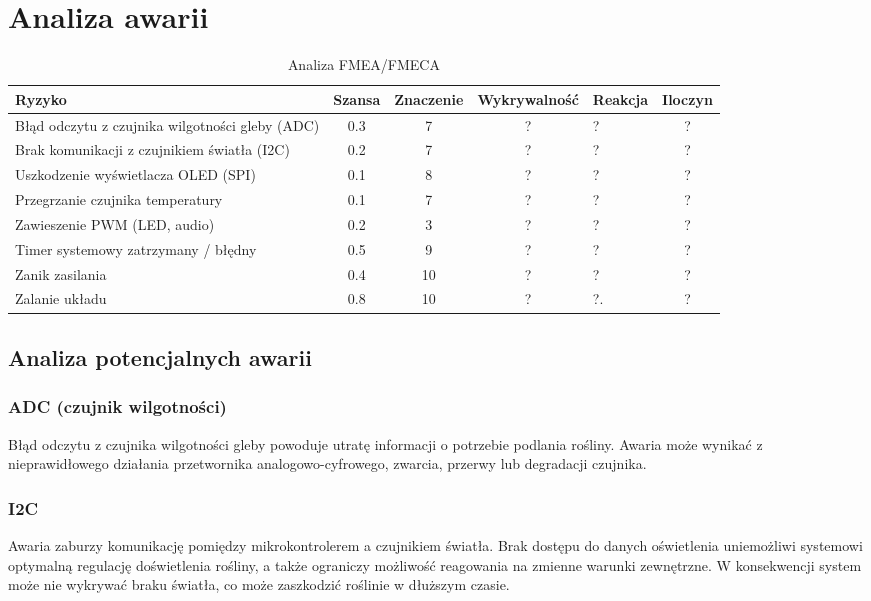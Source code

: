 \documentclass{article}
\begin{document}
\section{Analiza awarii}

\begin{table}[H]
\centering
\caption{Analiza FMEA/FMECA}
\begin{tabular}{|p{4.2cm}|c|c|c|p{4.5cm}|c|}
\hline
\textbf{Ryzyko} & \textbf{Szansa} & \textbf{Znaczenie} & \textbf{Wykrywalność} & \textbf{Reakcja} & \textbf{Iloczyn} \\
\hline
Błąd odczytu z czujnika wilgotności gleby (ADC) & 0.3 &\cellcolor{yellow!50} 7 & ? & ? & ? \\
\hline
Brak komunikacji z czujnikiem światła (I2C) & 0.2 &\cellcolor{yellow!50} 7 & ? & ? & ? \\
\hline
Uszkodzenie wyświetlacza OLED (SPI) & 0.1 &\cellcolor{yellow!50} 8 & ? & ? & ? \\
\hline
Przegrzanie czujnika temperatury & 0.1 &\cellcolor{yellow!50} 7 & ? & ? & ? \\
\hline
Zawieszenie PWM (LED, audio) & 0.2 &\cellcolor{green!50} 3 & ? & ? & ? \\
\hline
Timer systemowy zatrzymany / błędny & 0.5 & \cellcolor{red!50}9 & ? & ? & ? \\
\hline
Zanik zasilania & 0.4 & \cellcolor{red!50}10 & ? & ? & ? \\
\hline
Zalanie układu & 0.8 & \cellcolor{red!50}10 & ? & ?. & ? \\
\hline
\end{tabular}
\end{table}

\subsection{Analiza potencjalnych awarii}

\subsubsection{ADC (czujnik wilgotności)}
Błąd odczytu z czujnika wilgotności gleby powoduje utratę informacji o potrzebie podlania rośliny. Awaria może wynikać z nieprawidłowego działania przetwornika analogowo-cyfrowego, zwarcia, przerwy lub degradacji czujnika.

\subsubsection{I2C}
Awaria zaburzy komunikację pomiędzy mikrokontrolerem a czujnikiem światła. Brak dostępu do danych oświetlenia uniemożliwi systemowi optymalną regulację doświetlenia rośliny, a także ograniczy możliwość reagowania na zmienne warunki zewnętrzne. W konsekwencji system może nie wykrywać braku światła, co może zaszkodzić roślinie w dłuższym czasie. 
\end{document}
